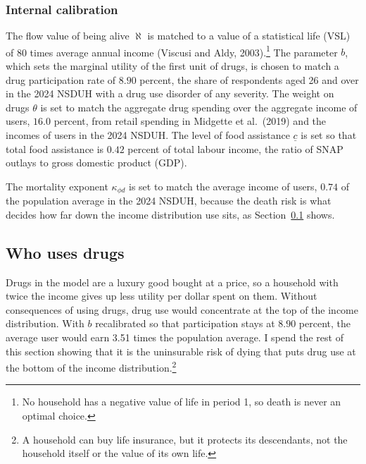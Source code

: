 \documentclass[10pt]{article}
\begin{document}
\subsubsection{Internal calibration}

The flow value
of being alive $\aleph$ is matched to a value of a statistical life (VSL) of 80
times average annual income (Viscusi and Aldy, 2003).\footnote{No household has a negative value of life in period 1, so death is never an optimal choice.} The parameter $b$, which sets the marginal utility of the first unit of drugs, is chosen to match a drug participation rate of
$8.90$ percent, the share of respondents aged 26 and over in the 2024 NSDUH with a drug use disorder of any severity. The weight on drugs $\theta$ is set to match the aggregate drug spending over the
aggregate income of users, $16.0$ percent, from retail spending in Midgette et al.\ (2019) and the incomes of users in
the 2024 NSDUH. The level of food assistance $\underline c$ is set so that total food assistance is $0.42$ percent of total labour income, the ratio of SNAP outlays to gross domestic product (GDP).

The mortality exponent $\kappa_{\phi d}$ is set to match the average income of users,
$0.74$ of the population average in the 2024 NSDUH, because the death risk is what decides how far down
the income distribution use sits, as Section~\ref{sec:who} shows.

\begin{table}[!tb]
\centering
\caption{Externally set parameters}\label{tab:ext}
\sbox{\ntbox}{}\usebox{\ntbox}
\end{table}

\begin{table}[!tb]
\centering
\caption{Internally calibrated parameters}\label{tab:int}
\sbox{\ntbox}{}\usebox{\ntbox}
\end{table}

\subsection{Who uses drugs}\label{sec:who}

Drugs in the model are a luxury good bought at a price, so a household with
twice the income gives up less utility per dollar spent on them.   Without consequences of using drugs, drug use would concentrate at the top of the income distribution. With $b$ recalibrated so that participation stays at $8.90$ percent, the average user would earn 3.51 times the population average. I spend the rest of this section showing that it is the uninsurable risk of dying that puts drug use at the bottom of the income distribution.\footnote{A household can buy life insurance, but it protects its descendants, not the household itself or the value of its own life.}
\end{document}
